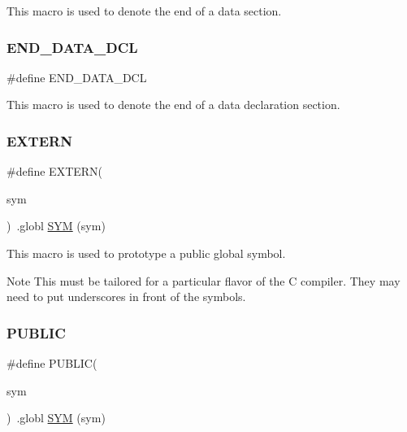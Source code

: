 This macro is used to denote the end of a data section. \mbox{\label{group__RTEMSScoreCPUV850ASM_gaba5951c6a7df52e7c13d07a6823e9758}} 
\subsubsection{\texorpdfstring{END\_DATA\_DCL}{END\_DATA\_DCL}}
{\footnotesize\ttfamily \#define E\+N\+D\+\_\+\+D\+A\+T\+A\+\_\+\+D\+CL}

This macro is used to denote the end of a data declaration section. \mbox{\label{group__RTEMSScoreCPUV850ASM_ga9808b867f8d1bd54d78548a5cd5dc415}} 
\subsubsection{\texorpdfstring{EXTERN}{EXTERN}}
{\footnotesize\ttfamily \#define E\+X\+T\+E\+RN(\begin{DoxyParamCaption}\item[{}]{sym }\end{DoxyParamCaption})~.globl \mbox{\hyperlink{group__RTEMSScoreCPUx86-64ASM_gafe05d428a5f345f51fb591debb815325}{S\+YM}} (sym)}

This macro is used to prototype a public global symbol.

\begin{DoxyNote}{Note}
This must be tailored for a particular flavor of the C compiler. They may need to put underscores in front of the symbols. 
\end{DoxyNote}
\mbox{\label{group__RTEMSScoreCPUV850ASM_ga5e536c0e80cb78da6a74541281111e40}} 
\subsubsection{\texorpdfstring{PUBLIC}{PUBLIC}}
{\footnotesize\ttfamily \#define P\+U\+B\+L\+IC(\begin{DoxyParamCaption}\item[{}]{sym }\end{DoxyParamCaption})~.globl \mbox{\hyperlink{group__RTEMSScoreCPUx86-64ASM_gafe05d428a5f345f51fb591debb815325}{S\+YM}} (sym)}

